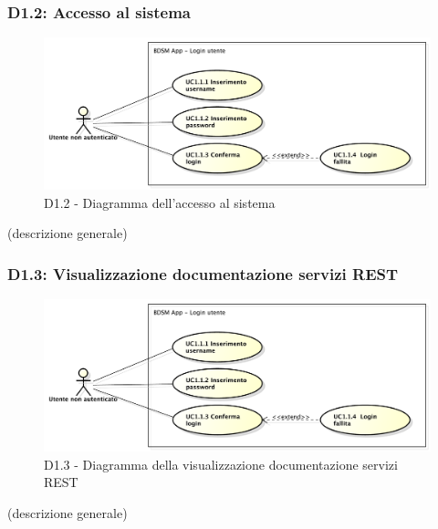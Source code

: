 		\subsubsection{D1.2: Accesso al sistema} %
		\label{ssub:accesso_al_sistema}
		\begin{figure}[!htbp]
			\centering
			\centerline{\includegraphics[scale=0.45]{./images/UC1_1.pdf}}
			\caption{D1.2 - Diagramma dell'accesso al sistema}
		\end{figure}
		\noindent
		[TO DO] (descrizione generale) \newline


		\subsubsection{D1.3: Visualizzazione documentazione servizi REST} %
		\label{ssub:visualizzazione_documentazione_servizi_rest}
		\begin{figure}[!htbp]
			\centering
			\centerline{\includegraphics[scale=0.45]{./images/UC1_1.pdf}}
			\caption{D1.3 - Diagramma della visualizzazione documentazione servizi REST}
		\end{figure}
		\noindent
		[TO DO] (descrizione generale)


	\pagebreak
\clearpage \newpage


